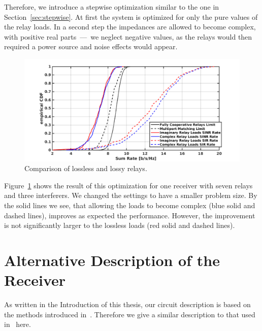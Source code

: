Therefore, we introduce a stepwise optimization similar to the one in Section~\ref{sec:stepwise}.
At first the system is optimized for only the pure values of the relay loads.
In a second step the impedances are allowed to become complex, with positive real parts~---~we neglect negative values, as the relays would then required a power source and noise effects would appear.
\begin{figure}[h]
\centering
  \includegraphics[width=\linewidth]{images/Imagvscomp_2.png}
\caption{Comparison of lossless and lossy relays.}
\label{fig:lossyrel_2}
\end{figure}

Figure~\ref{fig:lossyrel_2} shows the result of this optimization for one receiver with seven relays and three interferers.
We changed the settings to have a smaller problem size.
By the solid lines we see, that allowing the loads to become complex (blue solid and dashed lines), improves as expected the performance.
However, the improvement is not significantly larger to the lossless loads (red solid and dashed lines).

\chapter{Alternative Description of the Receiver}
\label{sec:nossek}

As written in the Introduction of this thesis, our circuit description is based on the methods introduced in~\cite{Nossek}.
Therefore we give a similar description to that used in~\cite{Nossek} here. 

